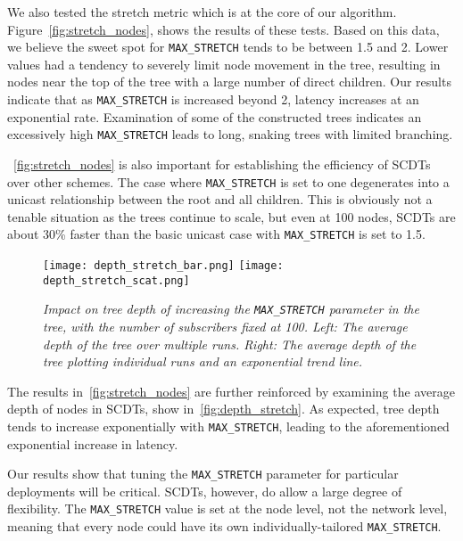 We also tested the stretch metric which is at the core of our algorithm. Figure~\autoref{fig:stretch_nodes}, shows the results of these tests. Based on this data, we believe the sweet spot for \texttt{MAX\_STRETCH} tends to be between 1.5 and 2. Lower values had a tendency to severely limit node movement in the tree, resulting in nodes near the top of the tree with a large number of direct children. Our results indicate that as \texttt{MAX\_STRETCH} is increased beyond 2, latency increases at an exponential rate. Examination of some of the constructed trees indicates an excessively high \texttt{MAX\_STRETCH} leads to long, snaking trees with limited branching.

~\autoref{fig:stretch_nodes} is also important for establishing the efficiency of SCDTs over other schemes.  The case where \texttt{MAX\_STRETCH} is set to one degenerates into a unicast relationship between the root and all children. This is obviously not a tenable situation as the trees continue to scale, but even at 100 nodes, SCDTs are about 30\% faster than the basic unicast case with \texttt{MAX\_STRETCH} is set to 1.5.

\begin{figure}[h]
	\begin{center}
		\texttt{[image: depth\_stretch\_bar.png]}
		\texttt{[image: depth\_stretch\_scat.png]}
	\end{center}
	\vspace{-1.3em}
	\caption{\small \itshape Impact on tree depth of increasing the \texttt{MAX\_STRETCH} parameter in the tree, with the number of subscribers fixed at 100. Left: The average depth of the tree over multiple runs. Right: The average depth of the tree plotting individual runs and an exponential trend line.}
	\vspace{-1em}
	\label{fig:depth_stretch}
\end{figure}

The results in~\autoref{fig:stretch_nodes} are further reinforced by examining the average depth of nodes in SCDTs, show in~\autoref{fig:depth_stretch}. As expected, tree depth tends to increase exponentially with \texttt{MAX\_STRETCH}, leading to the aforementioned exponential increase in latency.

Our results show that tuning the \texttt{MAX\_STRETCH} parameter for particular deployments will be critical. SCDTs, however, do allow a large degree of flexibility. The \texttt{MAX\_STRETCH} value is set at the node level, not the network level, meaning that every node could have its own individually-tailored \texttt{MAX\_STRETCH}.

